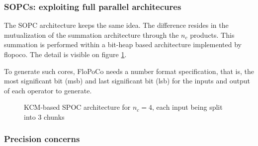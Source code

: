 	\subsubsection{SOPCs: exploiting full parallel architecures}

	The SOPC architecture keeps the same idea.
	The difference resides in the mutualization of the summation architecture through the $n_c$ products.
	This summation is performed within a bit-heap based architecture implemented by flopoco.
	The detail is visible on figure \ref{fig:Overall architecture}.

	To generate such cores, FloPoCo needs a number format specification, that is, the most significant bit (msb) and last significant bit (lsb) for the inputs and output of each operator to generate.

\begin{figure}
  \begin{center}
\end{center}
\caption{KCM-based SPOC architecture for $n_c=4$, each input being split into 3 chunks  \label{fig:Overall architecture}}
\end{figure}

	\subsubsection{Precision concerns}

